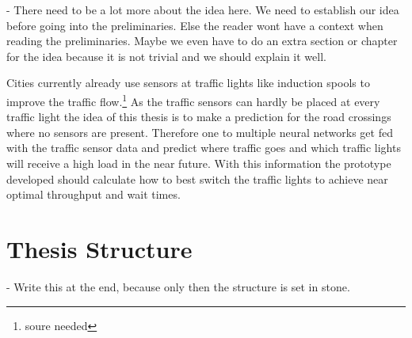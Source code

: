 

- There need to be a lot more about the idea here. We need to establish our idea before going into the preliminaries. Else the reader wont have a context when reading the preliminaries. Maybe we even have to do an extra section or chapter for the idea because it is not trivial and we should explain it well.

Cities currently already use sensors at traffic lights like induction spools to improve the traffic flow.\footnote{soure needed} As the traffic sensors can hardly be placed at every traffic light the idea of this thesis is to make a prediction for the road crossings where no sensors are present. Therefore one to multiple neural networks get fed with the traffic sensor data and predict where traffic goes and which traffic lights will receive a high load in the near future. With this information the prototype developed should calculate how to best switch the traffic lights to achieve near optimal throughput and wait times.

\newpage

\section{Thesis Structure}

- Write this at the end, because only then the structure is set in stone.